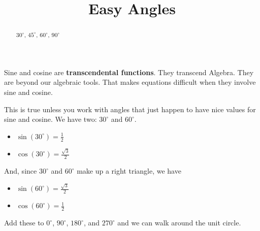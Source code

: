 \documentclass{ximera}
\title{Easy Angles}
\begin{document}
\begin{abstract}
$30^{\circ}$, $45^{\circ}$, $60^{\circ}$, $90^{\circ}$
\end{abstract}
\maketitle


Sine and cosine are \textbf{transcendental functions}.  They transcend Algebra. They are beyond our algebraic tools.  That makes equations difficult when they involve sine and cosine.


This is true unless you work with angles that just happen to have nice values for sine and cosine.  We have two: $30^{\circ}$ and $60^{\circ}$.




\begin{itemize}
\item $\sin(30^{\circ}) = \frac{1}{2}$
\item $\cos(30^{\circ}) = \frac{\sqrt{3}}{2}$
\end{itemize}


And, since $30^{\circ}$ and $60^{\circ}$ make up a right triangle, we have 


\begin{itemize}
\item $\sin(60^{\circ}) = \frac{\sqrt{3}}{2}$
\item $\cos(60^{\circ}) = \frac{1}{2}$
\end{itemize}


Add these to $0^{\circ}$, $90^{\circ}$, $180^{\circ}$, and $270^{\circ}$ and we can walk around the unit circle.
\end{document}
